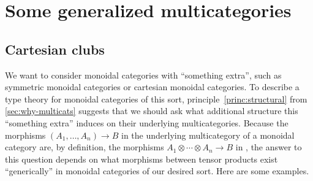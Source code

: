 \documentclass{book}
\let\tensor\otimes
\begin{document}
\section{Some generalized multicategories}
\label{sec:cartmulti}

\subsection{Cartesian clubs}
\label{sec:cart-clubs}

We want to consider monoidal categories with ``something extra'', such as symmetric monoidal categories or cartesian monoidal categories.
To describe a type theory for monoidal categories of this sort, principle~\eqref{princ:structural} from \cref{sec:why-multicats} suggests that we should ask what additional structure this ``something extra'' induces on their underlying multicategories.
Because the morphisms $(A_1,\dots,A_n) \to B$ in the underlying multicategory of a monoidal category \cC are, by definition, the morphisms $A_1\tensor\cdots\tensor A_n \to B$ in \cC, the answer to this question depends on what morphisms between tensor products exist ``generically'' in monoidal categories of our desired sort.
Here are some examples.
\end{document}
